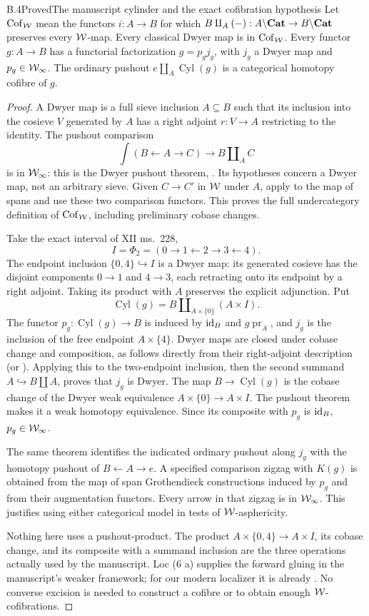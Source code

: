 \begin{claim}{B.4}{Proved}{The manuscript cylinder and the exact cofibration hypothesis}
Let $\operatorname{Cof}_{\mathcal{W}}$ mean the functors $i:A\to B$ for which $B\amalg_A(-):A\backslash\mathbf{Cat}\to B\backslash\mathbf{Cat}$ preserves every $\mathcal{W}$-map. Every classical Dwyer map is in $\operatorname{Cof}_{\mathcal{W}}$. Every functor $g:A\to B$ has a functorial factorization $g=p_gj_g$, with $j_g$ a Dwyer map and $p_g\in\mathcal{W}_{\infty}$. The ordinary pushout $e\amalg_A\operatorname{Cyl}(g)$ is a categorical homotopy cofibre of $g$.
\end{claim}
\begin{proof}
A Dwyer map is a full sieve inclusion $A\subseteq B$ such that its inclusion into the cosieve $V$ generated by $A$ has a right adjoint $r:V\to A$ restricting to the identity. The pushout comparison
\[
 \int(B\leftarrow A\to C)\longrightarrow B\amalg_A C
\]
is in $\mathcal{W}_{\infty}$: this is the Dwyer pushout theorem, \citet[Proposition 4.3]{RootThomason1980}. Its hypotheses concern a Dwyer map, not an arbitrary sieve. Given $C\to C'$ in $\mathcal{W}$ under $A$, apply  to the map of spans and use these two comparison functors. This proves the full undercategory definition of $\operatorname{Cof}_{\mathcal{W}}$, including preliminary cobase changes.

Take the exact interval of XII ms.~228,
\[
 I=\Phi_2=(0\to1\leftarrow2\to3\leftarrow4).
\]
The endpoint inclusion $\{0,4\}\hookrightarrow I$ is a Dwyer map: its generated cosieve has the disjoint components $0\to1$ and $4\to3$, each retracting onto its endpoint by a right adjoint. Taking its product with $A$ preserves the explicit adjunction. Put
\[
 \operatorname{Cyl}(g)=B\amalg_{A\times\{0\}}(A\times I).
\]
The functor $p_g:\operatorname{Cyl}(g)\to B$ is induced by $\mathrm{id}_B$ and $g\operatorname{pr}_A$, and $j_g$ is the inclusion of the free endpoint $A\times\{4\}$. Dwyer maps are closed under cobase change and composition, as follows directly from their right-adjoint description (or \citealp[Proposition 4.3 and Lemma 5.3(1)]{RootThomason1980}). Applying this to the two-endpoint inclusion, then the second summand $A\hookrightarrow B\amalg A$, proves that $j_g$ is Dwyer. The map $B\to\operatorname{Cyl}(g)$ is the cobase change of the Dwyer weak equivalence $A\times\{0\}\to A\times I$. The pushout theorem makes it a weak homotopy equivalence. Since its composite with $p_g$ is $\mathrm{id}_B$, $p_g\in\mathcal{W}_{\infty}$.

The same theorem identifies the indicated ordinary pushout along $j_g$ with the homotopy pushout of $B\leftarrow A\to e$. A specified comparison zigzag with $K(g)$ is obtained from the map of span Grothendieck constructions induced by $p_g$ and from their augmentation functors. Every arrow in that zigzag is in $\mathcal{W}_{\infty}$. This justifies using either categorical model in tests of $\mathcal{W}$-asphericity.

Nothing here uses a pushout-product. The product $A\times\{0,4\}\to A\times I$, its cobase change, and its composite with a summand inclusion are the three operations actually used by the manuscript. Loc (6 a) supplies the forward gluing in the manuscript's weaker framework; for our modern localizer it is already . No converse excision is needed to construct a cofibre or to obtain enough $\mathcal{W}$-cofibrations.
\end{proof}


